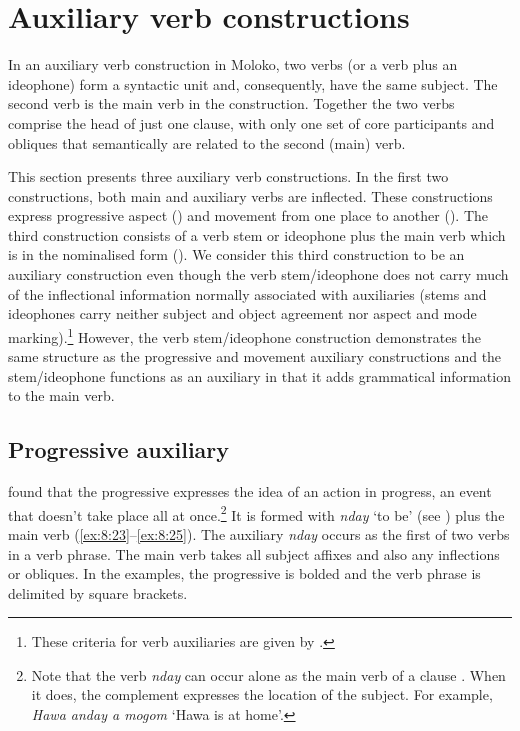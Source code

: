 \section{Auxiliary verb constructions}\label{sec:8.2}
\hypertarget{RefHeading1212541525720847}{}
In an auxiliary verb construction in Moloko, two verbs (or a verb plus an ideophone) form a syntactic unit and, consequently, have the same subject. The second verb is the main verb in the construction. Together the two verbs comprise the head of just one clause, with only one set of core participants and obliques that semantically are related to the second (main) verb. 

This section presents three auxiliary verb constructions. In the first two constructions, both main and auxiliary verbs are inflected.  These constructions express progressive aspect () and movement from one place to another ().  The third construction consists of a verb stem or ideophone plus the main verb which is in the nominalised form (). We consider this third construction to be an auxiliary construction even though the verb stem/ideophone does not carry much of the inflectional information normally associated with auxiliaries (stems and ideophones carry neither subject and object agreement nor aspect and mode marking).\footnote{These criteria for verb auxiliaries are given by \citet[84]{Payne1997}.} However, the verb stem/ideophone construction demonstrates the same structure as the progressive and movement auxiliary constructions and the stem/ideophone functions as an auxiliary in that it adds grammatical information to the main verb.  

\subsection{Progressive auxiliary}\label{sec:8.2.1}
\hypertarget{RefHeading1212561525720847}{}
\citet{FriesenMamalis2008} found that the progressive expresses the idea of an action in progress, an event that doesn’t take place all at once.\footnote{Note that the verb \textit{nday}  can occur alone as the main verb of a clause . When it does, the complement expresses the location of the subject. For example, \textit{Hawa anday a mogom} ‘Hawa is at home’.}  It is formed with \textit{nday} ‘to be’ (see ) plus the main verb (\ref{ex:8:23}--\ref{ex:8:25}).  The auxiliary \textit{nday} occurs as the first of two verbs in a verb phrase. The main verb takes all subject affixes and also any inflections or obliques. In the examples, the progressive is bolded and the verb phrase is delimited by square brackets.

